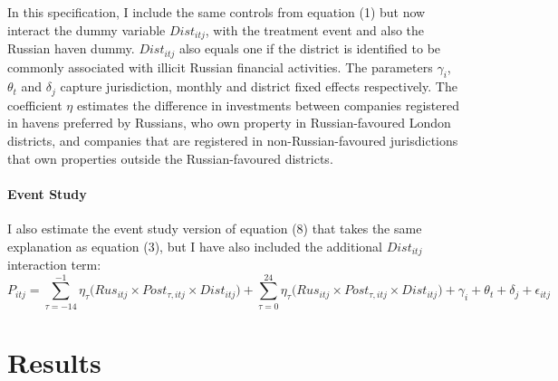 \documentclass{article}
\begin{document}
In this specification, I include the same controls from equation (1) but now interact the dummy variable $Dist_{itj}$, with the treatment event and also the Russian haven dummy. $Dist_{itj}$ also equals one if the district is identified to be commonly associated with illicit Russian financial activities. The parameters $\gamma_{i}$, $\theta_{t}$ and $\delta_{j}$ capture jurisdiction, monthly and district fixed effects respectively. The coefficient $\eta$ estimates the difference in investments between companies registered in havens preferred by Russians, who own property in Russian-favoured London districts, and companies that are registered in non-Russian-favoured jurisdictions that own properties outside the Russian-favoured districts. 


\paragraph{Event Study} I also estimate the event study version of equation (8) that takes the same explanation as equation (3), but I have also included the additional $Dist_{itj}$ interaction term:
\begin{equation}
P_{itj} =\sum^{-1}_{\tau=-14}\eta_\tau({Rus_{itj}}\times Post_{\tau,itj}\times{Dist_{itj})}+\sum^{24}_{\tau=0}\eta_\tau({Rus_{itj}}\times Post_{\tau,itj}\times{Dist_{itj})} + \gamma_i + \theta_{t} + \delta_{j} + \epsilon_{itj}
\end{equation}


\section{Results}
\end{document}
